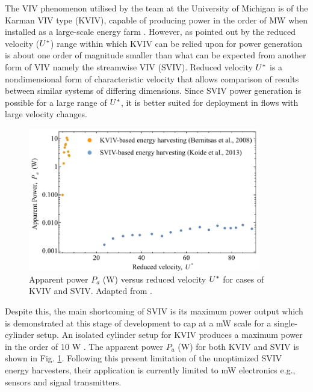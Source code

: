 \documentclass[oneside]{utmthesis}
\begin{document}
The VIV phenomenon utilised by the team at the University of Michigan is of the Karman VIV type (KVIV), capable of producing power in the order of MW when installed as a large-scale energy farm \citep{Raghavan2007}. However, as pointed out by \citet{Koide2013} the reduced velocity ($U^{*}$) range within which KVIV can be relied upon for power generation is about one order of magnitude smaller than what can be expected from another form of VIV namely the streamwise VIV (SVIV). Reduced velocity $U^{*}$ is a nondimensional form of characteristic velocity that allows comparison of results between similar systems of differing dimensions. Since SVIV power generation is possible for a large range of $U^{*}$, it is better suited for deployment in flows with large velocity changes.

\begin{figure}
  \centering
  \includegraphics[width=0.9\textwidth]{figs/apparentPowerKoide}
  \caption{Apparent power $P_a $ (W) versus reduced velocity $U^{*}$ for cases of KVIV and SVIV. Adapted from \citet{Koide2013}.}
  \label{fig:apparentPowerKoide}
\end{figure}

Despite this, the main shortcoming of SVIV is its maximum power output which is demonstrated at this stage of development to cap at a mW scale for a single-cylinder setup. An isolated cylinder setup for KVIV produces a maximum power in the order of 10 W \citep{Bernitsas2009}. The apparent power $P_a$ (W) for both KVIV and SVIV is shown in Fig. \ref{fig:apparentPowerKoide}. Following this present limitation of the unoptimized SVIV energy harvesters, their application is currently limited to mW electronics e.g., sensors and signal transmitters.

\end{document}
